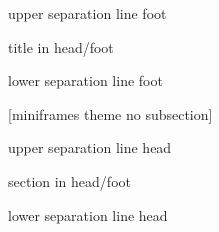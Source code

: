 {%
    \begin{beamercolorbox}[colsep=1.5pt]{upper separation line foot}
    \end{beamercolorbox}
    \begin{beamercolorbox}[ht=2.5ex,dp=1.125ex,%
            leftskip=.3cm,rightskip=.3cm plus1fil]{title in head/foot}%
        {\insertshorttitle}%
        \hfill%
        {\insertframenumber~\frameofframes~\inserttotalframenumber}
    \end{beamercolorbox}%
    \begin{beamercolorbox}[colsep=1.5pt]{lower separation line foot}
    \end{beamercolorbox}
}
[miniframes theme no subsection]
{%
    \begin{beamercolorbox}[colsep=1.5pt]{upper separation line head}
    \end{beamercolorbox}
    \begin{beamercolorbox}{section in head/foot}
        \vskip2pt\insertnavigation{\paperwidth}\vskip2pt
    \end{beamercolorbox}%
    \begin{beamercolorbox}[colsep=1.5pt]{lower separation line head}
    \end{beamercolorbox}
}

\newcommand{\pandocbounded}[1]{#1}

\makeatother
